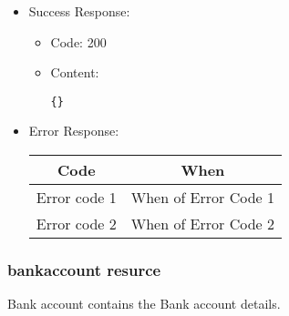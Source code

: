 \begin{itemize}
    \item Success Response: 
    \begin{itemize}
        \item Code: 200
        \item Content:
        \begin{lstlisting}
{}
        \end{lstlisting}    
    \end{itemize}
    
    \item Error Response:
    \begin{table}[!h]
    \centering 
    \begin{tabular}{|c|c|}
    \hline
    \multicolumn{1}{|c|}{\textbf{Code}} & \multicolumn{1}{c|}{\textbf{When}} \\ \hline
    Error code 1 & When of Error Code 1 \\\hline
    Error code 2 & When of Error Code 2 \\\hline
    \end{tabular} 
    \end{table} 
    
\end{itemize}


\subsubsection*{bankaccount resurce}


Bank account contains the Bank account details.

